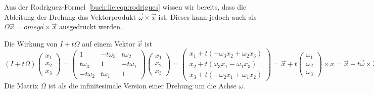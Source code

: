 Aus der Rodriguez-Formel~\ref{buch:lie:eqn:rodrigues} wissen wir
bereits, dass die Ableitung der Drehung das Vektorprodukt
$\vec{\omega}\times\vec{x}$ ist.
Dieses kann jedoch auch als
$\Omega\vec{x} = \vec{omega}\times\vec{x}$
ausgedrückt werden.

Die Wirkung von $I+t\Omega$ auf einem Vektor $\vec{x}$ ist
\[
(I+t\Omega)
\begin{pmatrix}x_1\\x_2\\x_3\end{pmatrix}
=
\begin{pmatrix}
    1     &-t\omega_3& t\omega_2\\
 t\omega_3&   1      &-t\omega_1\\
-t\omega_2& t\omega_1&    1
\end{pmatrix}
\begin{pmatrix}x_1\\x_2\\x_3\end{pmatrix}
=
\begin{pmatrix}
x_1+t(-\omega_3x_2+\omega_2x_3)\\
x_2+t( \omega_3x_1-\omega_1x_3)\\
x_3+t(-\omega_2x_1+\omega_1x_2)
\end{pmatrix}
=
\vec{x}+ t\begin{pmatrix}\omega_1\\\omega_2\\\omega_3\end{pmatrix}\times x
=
\vec{x}+ t\vec{\omega}\times \vec{x}.
\]
Die Matrix $\Omega$ ist als die infinitesimale Version einer Drehung
um die Achse $\omega$.

